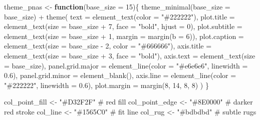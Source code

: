 \documentclass[
  letterpaper,
  DIV=11,
  numbers=noendperiod]{scrreprt}
\newenvironment{Shaded}{\begin{snugshade}}{\end{snugshade}}
\newcommand{\AttributeTok}[1]{\textcolor[rgb]{0.40,0.45,0.13}{#1}}
\newcommand{\CommentTok}[1]{\textcolor[rgb]{0.37,0.37,0.37}{#1}}
\newcommand{\ControlFlowTok}[1]{\textcolor[rgb]{0.00,0.23,0.31}{\textbf{#1}}}
\newcommand{\DecValTok}[1]{\textcolor[rgb]{0.68,0.00,0.00}{#1}}
\newcommand{\FloatTok}[1]{\textcolor[rgb]{0.68,0.00,0.00}{#1}}
\newcommand{\FunctionTok}[1]{\textcolor[rgb]{0.28,0.35,0.67}{#1}}
\newcommand{\NormalTok}[1]{\textcolor[rgb]{0.00,0.23,0.31}{#1}}
\newcommand{\OtherTok}[1]{\textcolor[rgb]{0.00,0.23,0.31}{#1}}
\newcommand{\SpecialCharTok}[1]{\textcolor[rgb]{0.37,0.37,0.37}{#1}}
\newcommand{\StringTok}[1]{\textcolor[rgb]{0.13,0.47,0.30}{#1}}
\begin{document}
\begin{Shaded}
\begin{Highlighting}[]
\NormalTok{theme\_pnas }\OtherTok{\textless{}{-}} \ControlFlowTok{function}\NormalTok{(}\AttributeTok{base\_size =} \DecValTok{15}\NormalTok{)\{}
  \FunctionTok{theme\_minimal}\NormalTok{(}\AttributeTok{base\_size =}\NormalTok{ base\_size) }\SpecialCharTok{+}
    \FunctionTok{theme}\NormalTok{(}
      \AttributeTok{text =} \FunctionTok{element\_text}\NormalTok{(}\AttributeTok{color =} \StringTok{"\#222222"}\NormalTok{),}
      \AttributeTok{plot.title =} \FunctionTok{element\_text}\NormalTok{(}\AttributeTok{size =}\NormalTok{ base\_size }\SpecialCharTok{+} \DecValTok{7}\NormalTok{, }\AttributeTok{face =} \StringTok{"bold"}\NormalTok{, }\AttributeTok{hjust =} \DecValTok{0}\NormalTok{),}
      \AttributeTok{plot.subtitle =} \FunctionTok{element\_text}\NormalTok{(}\AttributeTok{size =}\NormalTok{ base\_size }\SpecialCharTok{+} \DecValTok{1}\NormalTok{, }\AttributeTok{margin =} \FunctionTok{margin}\NormalTok{(}\AttributeTok{b =} \DecValTok{6}\NormalTok{)),}
      \AttributeTok{plot.caption =} \FunctionTok{element\_text}\NormalTok{(}\AttributeTok{size =}\NormalTok{ base\_size }\SpecialCharTok{{-}} \DecValTok{2}\NormalTok{, }\AttributeTok{color =} \StringTok{"\#666666"}\NormalTok{),}
      \AttributeTok{axis.title =} \FunctionTok{element\_text}\NormalTok{(}\AttributeTok{size =}\NormalTok{ base\_size }\SpecialCharTok{+} \DecValTok{3}\NormalTok{, }\AttributeTok{face =} \StringTok{"bold"}\NormalTok{),}
      \AttributeTok{axis.text =} \FunctionTok{element\_text}\NormalTok{(}\AttributeTok{size =}\NormalTok{ base\_size),}
      \AttributeTok{panel.grid.major =} \FunctionTok{element\_line}\NormalTok{(}\AttributeTok{color =} \StringTok{"\#e6e6e6"}\NormalTok{, }\AttributeTok{linewidth =} \FloatTok{0.6}\NormalTok{),}
      \AttributeTok{panel.grid.minor =} \FunctionTok{element\_blank}\NormalTok{(),}
      \AttributeTok{axis.line =} \FunctionTok{element\_line}\NormalTok{(}\AttributeTok{color =} \StringTok{"\#222222"}\NormalTok{, }\AttributeTok{linewidth =} \FloatTok{0.6}\NormalTok{),}
      \AttributeTok{plot.margin =} \FunctionTok{margin}\NormalTok{(}\DecValTok{8}\NormalTok{, }\DecValTok{14}\NormalTok{, }\DecValTok{8}\NormalTok{, }\DecValTok{8}\NormalTok{)}
\NormalTok{    )}
\NormalTok{\}}

\NormalTok{col\_point\_fill }\OtherTok{\textless{}{-}} \StringTok{"\#D32F2F"}  \CommentTok{\# red fill}
\NormalTok{col\_point\_edge }\OtherTok{\textless{}{-}} \StringTok{"\#8E0000"}  \CommentTok{\# darker red stroke}
\NormalTok{col\_line       }\OtherTok{\textless{}{-}} \StringTok{"\#1565C0"}  \CommentTok{\# fit line}
\NormalTok{col\_rug        }\OtherTok{\textless{}{-}} \StringTok{"\#bdbdbd"}  \CommentTok{\# subtle rugs}


\end{Highlighting}
\end{Shaded}
\end{document}

